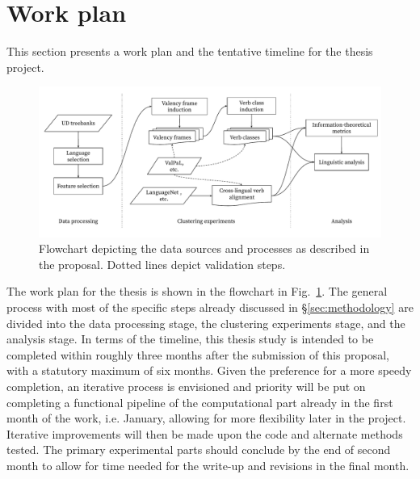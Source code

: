 \section{Work plan}\label{sec:plan}

This section presents a work plan and the tentative timeline for the thesis project.

\begin{figure}[t]
    \centering
    \begin{adjustbox}{center,scale=0.65}
    \includegraphics{figures/proposal_flowchart.pdf}
    \end{adjustbox}
    \caption{Flowchart depicting the data sources and processes as described in the proposal. Dotted lines depict validation steps.}\label{fig:flowchart}
\end{figure}

The work plan for the thesis is shown in the flowchart in Fig.~\ref{fig:flowchart}. The general process with most of the specific steps already discussed in \S\ref{sec:methodology} are divided into the data processing stage, the clustering experiments stage, and the analysis stage. In terms of the timeline, this thesis study is intended to be completed within roughly three months after the submission of this proposal, with a statutory maximum of six months. Given the preference for a more speedy completion, an iterative process is envisioned and priority will be put on completing a functional pipeline of the computational part already in the first month of the work, i.e. January, allowing for more flexibility later in the project. Iterative improvements will then be made upon the code and alternate methods tested. The primary experimental parts should conclude by the end of second month to allow for time needed for the write-up and revisions in the final month. 
